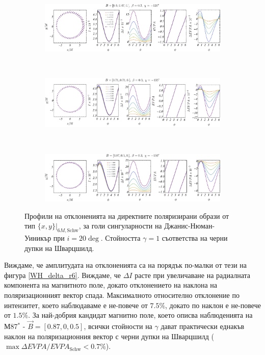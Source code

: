 \begin{figure}[!htb]
	\begin{subfigure}{12cm}
		\hspace{-0.5cm}
		\includegraphics[scale = 0.8]{JNW/pol_20_1.pdf}
	\end{subfigure}\\
	\begin{subfigure}{12cm}
		\hspace{-0.5cm}
		\includegraphics[scale = 0.4]{JNW/pol_20_2.pdf}
	\end{subfigure}\\
	\begin{subfigure}{12cm}
		\hspace{-0.5cm}
		\includegraphics[scale = 0.6]{JNW/pol_20_3.pdf}
	\end{subfigure}
	\caption[Профили на отклоненията на директните поляризирани образи oт тип $\{x,y\}\vert_{6M, \text{Schw}}$, за $i = 20\deg$ за голи сингуларности на Джанис-Нюман-Уиникър.]{\small Профили на отклоненията на директните поляризирани образи от тип $\{x,y\}\vert_{6M, \text{Schw}}$, за голи сингуларности на Джанис-Нюман-Уиникър при $i = 20\deg$. Стойността $\gamma = 1$ съответства на черни дупки на Шварцшилд.} 
	\label{JNW_delta_r6_20_deg}
\end{figure}

Виждаме, че амплитудата на отклоненията са на порядък по-малки от тези на фигура \ref{WH_delta_r6}. Виждаме, че $\Delta I$ расте при увеличаване на радиалната компонента на магнитното поле, докато отклонението на наклона на поляризационният вектор спада. Максималното относително отклонение по интензитет, което наблюдаваме е не-повече от $7.5\%$, докато по наклон е не-повече от $1.5\%$. За най-добрия кандидат магнитно поле, което описва наблюденията на М87$^*$ - $\vec{B} = [0.87, 0, 0.5]$, всички стойности на $\gamma$ дават практически еднакъв наклон на поляризационния вектор с черни дупки на Шварцшилд ($\max \Delta EVPA / EVPA_\text{Schw}<0.7\%$).\\


